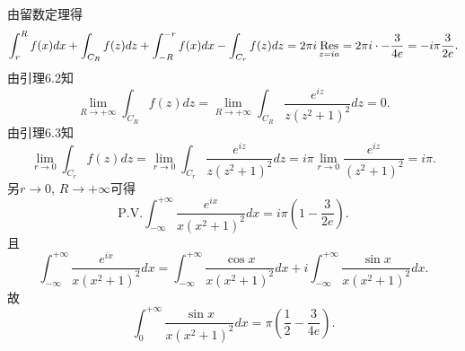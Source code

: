 \documentclass[11pt,a4paper]{article}
\newcommand{\res}[1]{\mathop{\Res}\limits_{#1}}
\begin{document}
由留数定理得
$$\int_r^Rf(x)dx+\int_{C_R}f(z)dz+\int_{-R}^{-r}f(x)dx-\int_{C_r}f(z)dz=2\pi i\res{z=ia}=2\pi i\cdot -\frac{3}{4e}=-i\pi\frac{3}{2e}.$$
由引理6.2知
$$\lim_{R\to+\infty}\int_{C_R}f(z)dz=\lim_{R\to+\infty}\int_{C_R}\frac{e^{iz}}{z(z^2+1)^2}dz=0.$$
由引理6.3知
$$\lim_{r\to0}\int_{C_r}f(z)dz=\lim_{r\to0}\int_{C_r}\frac{e^{iz}}{z(z^2+1)^2}dz=i\pi\lim_{r\to0}\frac{e^{iz}}{(z^2+1)^2}=i\pi.$$
另$r\to0$, $R\to+\infty$可得
$$\text{P.V.}\int_{-\infty}^{+\infty}\frac{e^{ix}}{x(x^2+1)^2}dx=i\pi\left(1-\frac{3}{2e}\right).$$
且
$$\int_{-\infty}^{+\infty}\frac{e^{ix}}{x(x^2+1)^2}dx=\int_{-\infty}^{+\infty}\frac{\cos x}{x(x^2+1)^2}dx+i\int_{-\infty}^{+\infty}\frac{\sin x}{x(x^2+1)^2}dx.$$
故
$$\int_0^{+\infty}\frac{\sin x}{x(x^2+1)^2}dx=\pi\left(\frac{1}{2}-\frac{3}{4e}\right).$$
\end{document}
